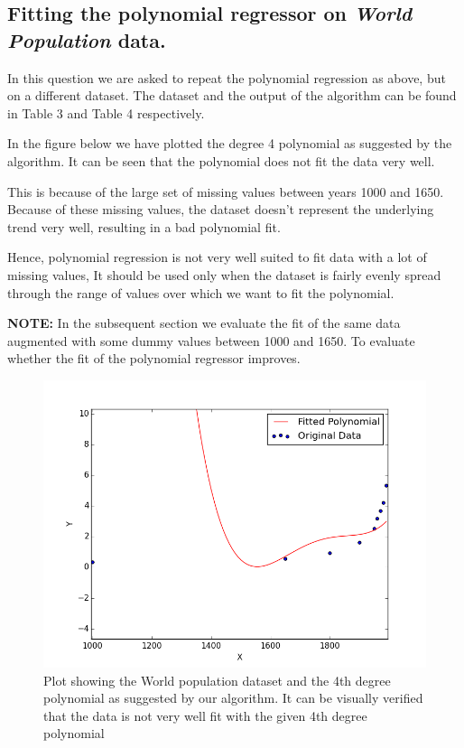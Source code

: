 \documentclass[a4paper,11pt]{article}
\begin{document}
\subsection{Fitting the polynomial regressor on \textit{World Population} data.}\label{prob3b}
In this question we are asked to repeat the polynomial regression as above, but on a different dataset. The dataset and the output of the algorithm can be found in Table 3 and Table 4 respectively.

In the figure below we have plotted the degree 4 polynomial as suggested by the algorithm. It can be seen that the polynomial does not fit the data very well.

This is because of the large set of missing values between years 1000 and 1650. Because of these missing values, the dataset doesn't represent the underlying trend very well, resulting in a bad polynomial fit.
 
Hence, polynomial regression is not very well suited to fit data with a lot of missing values, It should be used only when the dataset is fairly evenly spread through the range of values over which we want to fit the polynomial.

\textbf{NOTE:} In the subsequent section we evaluate the fit of the same data augmented with some dummy values between 1000 and 1650. To evaluate whether the fit of the polynomial regressor improves.
\begin{figure}[ht]
	\center
    \includegraphics[scale=0.75]{Q1b_fig.png}
    \caption{Plot showing the World population dataset and the 4th degree polynomial as suggested by our algorithm. It can be visually verified that the data is not very well fit with the given 4th degree polynomial}
	\label{fig:world_pop}
\end{figure}
\end{document}
